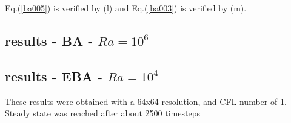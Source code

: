 Eq.(\ref{ba005}) is verified by (l) and Eq.(\ref{ba003}) is verified by (m).




\newpage
\subsection{results - BA - $Ra=10^6$}






\newpage
\subsection{results - EBA - $Ra=10^4$}

These results were obtained with a 64x64 resolution, and CFL number of 1. Steady state was reached 
after about 2500 timesteps 

